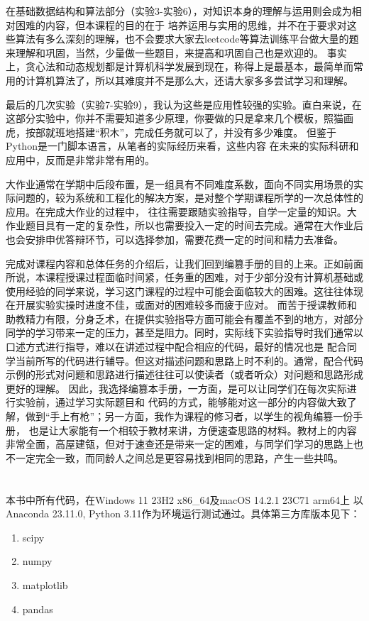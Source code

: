 \documentclass[UTF8,a5paper,10pt]{ctexbook}
\makeatletter
\renewcommand\tableofcontents{%
    \thispagestyle{empty}
    \section*{\contentsname
        \@mkboth{%
           \MakeUppercase\contentsname}{\MakeUppercase\contentsname}}%
    \@starttoc{toc}%
    \newpage
    }
\makeatother
\begin{document}
在基础数据结构和算法部分（实验3-实验6），对知识本身的理解与运用则会成为相对困难的内容，但本课程的目的在于
培养运用与实用的思维，并不在于要求对这些算法有多么深刻的理解，也不会要求大家去leetcode等算法训练平台做大量的题来理解和巩固，当然，少量做一些题目，来提高和巩固自己也是欢迎的。
事实上，贪心法和动态规划都是计算机科学发展到现在，称得上是最基本，最简单而常用的计算机算法了，所以其难度并不是那么大，还请大家多多尝试学习和理解。

最后的几次实验（实验7-实验9），我认为这些是应用性较强的实验。直白来说，在这部分实验中，你并不需要知道多少原理，你要做的只是拿来几个模板，照猫画虎，按部就班地搭建“积木”，完成任务就可以了，并没有多少难度。
但鉴于Python是一门脚本语言，从笔者的实际经历来看，这些内容
在未来的实际科研和应用中，反而是非常非常有用的。

大作业通常在学期中后段布置，是一组具有不同难度系数，面向不同实用场景的实际问题的，较为系统和工程化的解决方案，是对整个学期课程所学的一次总体性的应用。在完成大作业的过程中，
往往需要跟随实验指导，自学一定量的知识。大作业题目具有一定的复杂性，所以也需要投入一定的时间去完成。通常在大作业后也会安排申优答辩环节，可以选择参加，需要花费一定的时间和精力去准备。

完成对课程内容和总体任务的介绍后，让我们回到编篡手册的目的上来。正如前面所说，本课程授课过程面临时间紧，任务重的困难，对于少部分没有计算机基础或使用经验的同学来说，学习这门课程的过程中可能会面临较大的困难。这往往体现在开展实验实操时进度不佳，或面对的困难较多而疲于应对。
而苦于授课教师和助教精力有限，分身乏术，在提供实验指导方面可能会有覆盖不到的地方，对部分同学的学习带来一定的压力，甚至是阻力。同时，实际线下实验指导时我们通常以口述方式进行指导，难以在讲述过程中配合相应的代码，最好的情况也是
配合同学当前所写的代码进行辅导。但这对描述问题和思路上时不利的。通常，配合代码示例的形式对问题和思路进行描述往往可以使读者（或者听众）对问题和思路形成更好的理解。
因此，我选择编篡本手册，一方面，是可以让同学们在每次实际进行实验前，通过学习实际题目和
代码的方式，能够能对这一部分的内容做大致了解，做到“手上有枪”；另一方面，我作为课程的修习者，以学生的视角编篡一份手册，
也是让大家能有一个相较于教材来讲，方便速查思路的材料。教材上的内容非常全面，高屋建瓴，但对于速查还是带来一定的困难，与同学们学习的思路上也不一定完全一致，而同龄人之间总是更容易找到相同的思路，产生一些共鸣。
\newpage
\tableofcontents
\thispagestyle{empty}
本书中所有代码，在Windows 11 23H2 x86\_64及macOS 14.2.1 23C71 arm64上
以Anaconda 23.11.0, Python 3.11作为环境运行测试通过。具体第三方库版本见下：
\begin{enumerate}
    \item scipy
    \item numpy
    \item matplotlib
    \item pandas
\end{enumerate}
\newpage
{}


\end{document}
